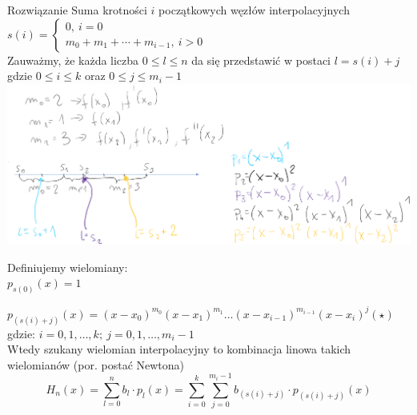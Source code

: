 \begin{frame}{Rozwiązanie}
Suma krotności $i$ początkowych węzłów interpolacyjnych
\vspace{2mm}
$s(i)=\left\{\begin{array}{l}
0,\ i=0\\
m_{0}+m_{1}+\cdots+m_{i-1},\ i>0
\end{array}\right.$
\vspace{2mm}\\

Zauważmy, że każda liczba 
$0\leq l\leq n$ da się przedstawić w postaci $l=s(i)+j$ gdzie $0 \leq i \leq k$ oraz $0 \leq j \leq m_{i}-1$\\
\includegraphics[scale=0.4]{img/3/hermit.png}
\end{frame}
\begin{frame}
\vspace{0.5cm}
Definiujemy wielomiany:\\
$p_{s(0)}(x)=1$

$p_{(s(i)+j)}(x)=(x-x_{0})^{m_{0}}(x-x_{1})^{m_{1}}\ldots(x-x_{i-1})^{m_{i-1}}(x-x_{i})^{j}(\star)$ \\
gdzie: $i=0, 1, \dots, k; \: j=0,1, \dots , m_{i}-1$ \\
Wtedy szukany wielomian interpolacyjny to kombinacja linowa takich wielomianów (por. postać Newtona)
$$
H_{n}(x)=\sum_{l=0}^{n}b_{l}\cdot p_{l}(x)=\sum_{i=0}^{k}\sum_{j=0}^{m_{i}-1}b_{(s(i)+j)}\cdot p_{(s(i)+j)}(x)
$$
\end{frame}

